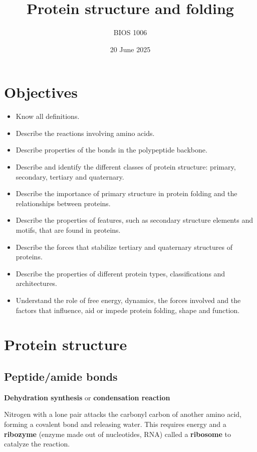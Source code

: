 \documentclass[letterpaper, 12pt]{article}
\title{Protein structure and folding}
\author{BIOS 1006}
\date{20 June 2025}
\begin{document}
\maketitle

\section*{Objectives}

\begin{itemize}
\item Know all definitions.
\item Describe the reactions involving amino acids.
\item Describe properties of the bonds in the polypeptide backbone.
\item Describe and identify the different classes of protein structure: primary, secondary, tertiary and quaternary.
\item Describe the importance of primary structure in protein folding and the relationships between proteins.
\item Describe the properties of features, such as secondary structure elements and motifs, that are found in proteins.
\item Describe the forces that stabilize tertiary and quaternary structures of proteins.
\item Describe the properties of different protein types, classifications and architectures.
\item Understand the role of free energy, dynamics, the forces involved and the factors that influence, aid or impede protein folding, shape and function.
\end{itemize}

\newpage

\section*{Protein structure}

\subsection*{Peptide/amide bonds}

\textbf{Dehydration synthesis} or \textbf{condensation reaction}

Nitrogen with a lone pair attacks the carbonyl carbon of another amino acid, forming a covalent bond and releasing water. This requires energy and a \textbf{ribozyme} (enzyme made out of nucleotides, RNA) called a \textbf{ribosome} to catalyze the reaction.
\end{document}
